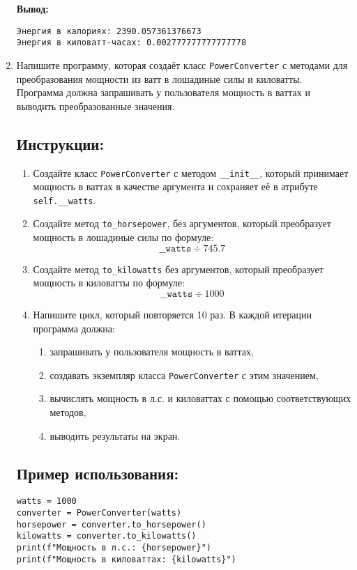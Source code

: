 \begin{enumerate}
\textbf{Вывод:}
\begin{verbatim}
Энергия в калориях: 2390.057361376673
Энергия в киловатт-часах: 0.002777777777777778
\end{verbatim}

\item 

Напишите программу, которая создаёт класс \texttt{PowerConverter} с методами для преобразования мощности
из ватт в лошадиные силы и киловатты. Программа должна запрашивать у пользователя мощность в ваттах
и выводить преобразованные значения.

\subsection*{Инструкции:}
\begin{enumerate}
\item Создайте класс \texttt{PowerConverter} с методом
\texttt{\_\_init\_\_}, который принимает мощность в ваттах в
качестве аргумента и сохраняет её в атрибуте \texttt{self.\_\_watts}.

\item Создайте метод \texttt{to\_horsepower},
без аргументов, который преобразует мощность в лошадиные силы по формуле:
\[
\texttt{\_\_watts} \div 745.7
\]

\item Создайте метод \texttt{to\_kilowatts} без аргументов,
который преобразует мощность в киловатты по формуле:
\[
\texttt{\_\_watts} \div 1000
\]

\item Напишите цикл, который повторяется 10 раз. В каждой итерации программа должна:
\begin{enumerate}
\item запрашивать у пользователя мощность в ваттах,
\item создавать экземпляр класса \texttt{PowerConverter} с этим значением,
\item вычислять мощность в л.с. и киловаттах с помощью соответствующих методов,
\item выводить результаты на экран.
\end{enumerate}
\end{enumerate}

\subsection*{Пример использования:}
\begin{verbatim}
watts = 1000
converter = PowerConverter(watts)
horsepower = converter.to_horsepower()
kilowatts = converter.to_kilowatts()
print(f"Мощность в л.с.: {horsepower}")
print(f"Мощность в киловаттах: {kilowatts}")
\end{verbatim}


\end{enumerate}
